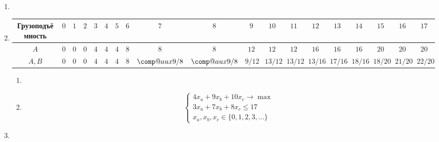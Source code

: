 \documentclass[12pt]{article}
\makeatletter
\newcommand*\comp[2][]{%
  \ensuremath{%
    \mathbin{%
      \mathpalette{\comp@aux{#1}}{#2}%
    }%
  }%
}
\newcommand*{\comp@aux}[3]{%
  #2%
  \mskip.5\thinmuskip\nonscript\mskip-.25\thinmuskip
  \begingroup
    \sbox0{%
      $%
        \m@th %
        #2%
        \mkern9mu %
      $%
    }%
  \edef\x{\endgroup
    \comp@unit=\the\wd0 %
  }\x
  \tikz[baseline=(char.base)]{%
    \node[
      rectangle,
      draw,
      minimum height=2\comp@unit,
      minimum width=2\comp@unit,
      rounded corners=\comp@unit,
      inner sep=.33\comp@unit,
      line width=.05\comp@unit,
      #1%
    ] (char) {%
      $%
        \m@th %
        #2%
        \rule{0pt}{\comp@unit}%
        #3%
      $%
    };%
  }%
  \mskip.5\thinmuskip\nonscript\mskip-.25\thinmuskip
}
\makeatother
\begin{document}
\begin{enumerate}
    \item 
    \item 
    \begin{tiny}
        \begin{tabular}{ccccccccccccccccccc}
        \toprule
        Грузоподъёмность & $0$ & $1$ & $2$ & $3$ & $4$ & $5$ & $6$ & $7$ & $8$ & $9$ & $10$ & $11$ & $12$ & $13$ & $14$ & $15$ & $16$ & $17$ \\
        \midrule
        $A$ & $0$ & $0$ & $0$ & $4$ & $4$ & $4$ & $8$ & $8$ & $8$ & $12$ & $12$ & $12$ & $16$ & $16$ & $16$ & $20$ & $20$ & $20$ \\
        $A, B$ & $0$ & $0$ & $0$ & $4$ & $4$ & $4$ & $8$ & $\comp{9}/8$ & $\comp{9}/8$ & $9/12$ & $13/12$ & $13/12$ & $13/16$ & $17/16$ & $18/16$ & $18/20$ & $21/20$ & $22/20$ \\
        \bottomrule
      \end{tabular}
      \end{tiny}

    \begin{enumerate}
        \item 
        \item 
    \[
    \begin{cases}
        4x_a + 9x_b + 10 x_c \to \max \\
        3x_a + 7x_b + 8x_c \leq 17 \\
        x_a, x_b, x_c \in \{0, 1, 2, 3, \ldots \}
    \end{cases}
    \]

    \end{enumerate}

    \item 


\end{enumerate}
\end{document}
